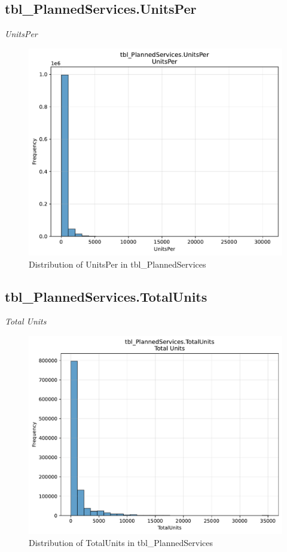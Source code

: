 \subsection{tbl\_PlannedServices.UnitsPer}
\textit{UnitsPer}

\begin{figure}[htbp]
\centering
\includegraphics[width=\textwidth]{figures/dbo_tbl_PlannedServices_UnitsPer.pdf}
\caption{Distribution of UnitsPer in tbl\_PlannedServices}
\end{figure}\newpage

\subsection{tbl\_PlannedServices.TotalUnits}
\textit{Total Units}

\begin{figure}[htbp]
\centering
\includegraphics[width=\textwidth]{figures/dbo_tbl_PlannedServices_TotalUnits.pdf}
\caption{Distribution of TotalUnits in tbl\_PlannedServices}
\end{figure}\newpage

